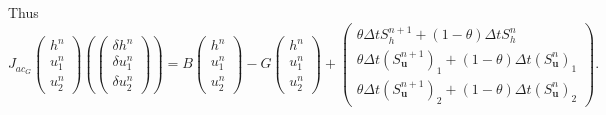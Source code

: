 \documentclass[a4paper, 11pt]{article}
\begin{document}
Thus
\begin{equation*}
J_{ac_G}\begin{pmatrix}h^n\\u_1^n\\u_2^n\end{pmatrix}\left(\begin{pmatrix}\delta h^n\\\delta u_1^n\\\delta u_2^n\end{pmatrix}\right)=B\begin{pmatrix}h^n\\u_1^n\\u_2^n\end{pmatrix}-G\begin{pmatrix}h^{n}\\u_1^{n}\\u_2^{n}\end{pmatrix}+\begin{pmatrix}\theta \Delta tS_h^{n+1}+(1-\theta)\Delta tS_h^{n}\\ \theta \Delta t\left(S_{\boldsymbol{u}}^{n+1}\right)_1+(1-\theta)\Delta t\left(S_{\boldsymbol{u}}^n\right)_1\\ \theta \Delta t\left(S_{\boldsymbol{u}}^{n+1}\right)_2+(1-\theta)\Delta t\left(S_{\boldsymbol{u}}^n\right)_2\end{pmatrix}.
\end{equation*}
\end{document}
